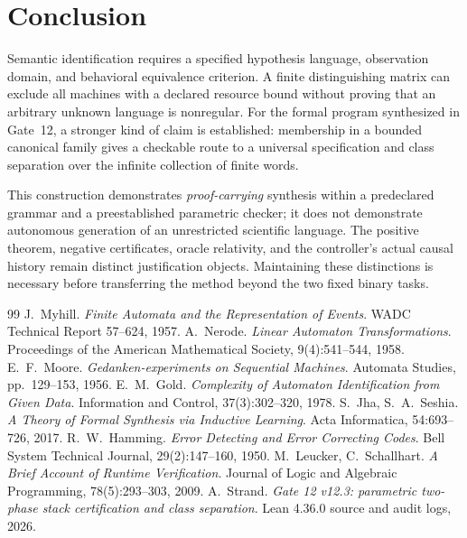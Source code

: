 \documentclass[11pt,a4paper]{article}
\begin{document}
\section{Conclusion}

Semantic identification requires a specified hypothesis language, observation domain, and behavioral equivalence criterion. A finite distinguishing matrix can exclude all machines with a declared resource bound without proving that an arbitrary unknown language is nonregular. For the formal program synthesized in Gate~12, a stronger kind of claim is established: membership in a bounded canonical family gives a checkable route to a universal specification and class separation over the infinite collection of finite words.

This construction demonstrates \emph{proof-carrying} synthesis within a predeclared grammar and a preestablished parametric checker; it does not demonstrate autonomous generation of an unrestricted scientific language. The positive theorem, negative certificates, oracle relativity, and the controller's actual causal history remain distinct justification objects. Maintaining these distinctions is necessary before transferring the method beyond the two fixed binary tasks.

\begin{thebibliography}{99}\setlength{\itemsep}{1pt}
 J.~Myhill. \emph{Finite Automata and the Representation of Events}. WADC Technical Report 57--624, 1957.
 A.~Nerode. \emph{Linear Automaton Transformations}. Proceedings of the American Mathematical Society, 9(4):541--544, 1958.
 E.~F.~Moore. \emph{Gedanken-experiments on Sequential Machines}. Automata Studies, pp.~129--153, 1956.
 E.~M.~Gold. \emph{Complexity of Automaton Identification from Given Data}. Information and Control, 37(3):302--320, 1978.
 S.~Jha, S.~A.~Seshia. \emph{A Theory of Formal Synthesis via Inductive Learning}. Acta Informatica, 54:693--726, 2017.
 R.~W.~Hamming. \emph{Error Detecting and Error Correcting Codes}. Bell System Technical Journal, 29(2):147--160, 1950.
 M.~Leucker, C.~Schallhart. \emph{A Brief Account of Runtime Verification}. Journal of Logic and Algebraic Programming, 78(5):293--303, 2009.
 A.~Strand. \emph{Gate 12 v12.3: parametric two-phase stack certification and class separation}. Lean 4.36.0 source and audit logs, 2026.
\end{thebibliography}
\end{document}
